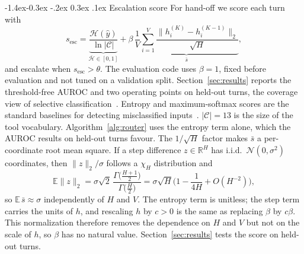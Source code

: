 \documentclass[10pt,twocolumn,letterpaper]{article}
\makeatletter
\renewcommand\subsection{\@startsection{subsection}{2}{\z@}%
  {-1.4ex\@plus -0.3ex \@minus -.2ex}%
  {0.3ex \@plus .1ex}%
  {\normalfont\normalsize\bfseries}}
\makeatother
\begin{document}
\subsection{Escalation score}\label{sec:escalation}
For hand-off we score each turn with
\begin{equation}\label{eq:escalate}
s_{\text{esc}} = \underbrace{\frac{\mathcal{H}(\hat y)}{\ln|\mathcal{C}|}}_{\bar{\mathcal H}\in[0,1]} + \beta\, \underbrace{\frac{1}{V}\sum_{i=1}^{V}\frac{\|h_i^{(K)}-h_i^{(K-1)}\|_2}{\sqrt{H}}}_{\bar s},
\end{equation}
and escalate when $s_{\text{esc}} > \theta$. The evaluation code uses $\beta{=}1$, fixed before evaluation and not tuned on a validation split. Section~\ref{sec:results} reports the threshold-free AUROC and two operating points on held-out turns, the coverage view of selective classification~\cite{chow1970optimum,geifman2017selective}. Entropy and maximum-softmax scores are the standard baselines for detecting misclassified inputs~\cite{hendrycks2017baseline}. $|\mathcal C|{=}13$ is the size of the tool vocabulary. Algorithm~\ref{alg:router} uses the entropy term alone, which the AUROC results on held-out turns favour. The $1/\sqrt{H}$ factor makes $\bar s$ a per-coordinate root mean square. If a step difference $z\in\mathbb{R}^H$ has i.i.d.\ $\mathcal{N}(0,\sigma^2)$ coordinates, then $\|z\|_2/\sigma$ follows a $\chi_H$ distribution and
\begin{equation}
\mathbb{E}\|z\|_2 = \sigma\sqrt{2}\,\frac{\Gamma\!\big(\tfrac{H+1}{2}\big)}{\Gamma\!\big(\tfrac{H}{2}\big)} = \sigma\sqrt{H}\Big(1 - \frac{1}{4H} + O(H^{-2})\Big),
\end{equation}
so $\mathbb{E}\,\bar s \approx \sigma$ independently of $H$ and $V$. The entropy term is unitless; the step term carries the units of $h$, and rescaling $h$ by $c>0$ is the same as replacing $\beta$ by $c\beta$. This normalization therefore removes the dependence on $H$ and $V$ but not on the scale of $h$, so $\beta$ has no natural value. Section~\ref{sec:results} tests the score on held-out turns.
\end{document}
